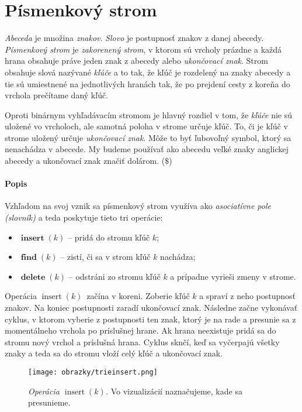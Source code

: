 
\def\k{k}
\def\put{$\mathop{insert}(\k)$}
\def\find{$\mathop{find}(\k)$}
\def\delete{$\mathop{delete}(\k)$}
\def\trie{trie}

\section{Písmenkový strom}
\emph{Abeceda} je množina \emph{znakov}. \emph{Slovo} je postupnosť znakov 
z danej abecedy. \emph{Písmenkový strom} je \emph{zakorenený strom}, v ktorom 
sú vrcholy prázdne a každá hrana obsahuje práve jeden znak z abecedy alebo 
\emph{ukončovací znak}. Strom 
obsahuje slová nazývané \emph{kľúče} a to tak, že kľúč je rozdelený na znaky 
abecedy a tie sú umiestnené na jednotlivých hranách tak, že po prejdení cesty 
z koreňa do vrchola prečítame daný kľúč. 

Oproti binárnym vyhľadávacím stromom je hlavný rozdiel v tom, že \emph{kľúče} 
nie sú uložené vo vrcholoch, ale samotná poloha v strome určuje kľúč. To, či 
je kľúč v strome uložený určuje \emph{ukončovací znak}. Môže to byť ľubovoľný 
symbol, ktorý sa nenachádza v abecede. My budeme používať ako abecedu veľké 
znaky anglickej abecedy a ukončovací znak značiť dolárom. ($\$$)

\paragraph{Popis}
Vzhľadom na svoj vznik sa písmenkový strom využíva ako \emph{asociatívne pole 
(slovník)} a teda poskytuje tieto tri operácie:
\begin{itemize}
\item $\mathop{\mathbf{insert}}(\k)$ -- pridá do stromu kľúč $\k$;
\item $\mathop{\mathbf{find}}(\k)$ -- zistí, či sa v strom kľúč $\k$ nachádza;
\item $\mathop{\mathbf{delete}}(\k)$ -- odstráni zo stromu kľúč $\k$ a 
prípadne vyrieši zmeny v strome.
\end{itemize}
Operácia \put\ začína v koreni. Zoberie kľúč $k$ a spraví z neho postupnosť 
znakov. Na koniec postupnosti zaradí ukončovací znak. 
Následne začne vykonávať cyklus, v ktorom vyberie z postupnosti ten znak, 
ktorý je na rade a presunie sa z momentálneho vrchola po príslušnej hrane. 
Ak hrana neexistuje pridá sa do stromu nový vrchol a príslušná hrana. Cyklus 
sknčí, keď sa vyčerpajú všetky znaky a teda sa do stromu vloží celý kľúč a 
ukončovací znak.

\begin{figure*}
\texttt{[image: obrazky/trieinsert.png]}
\caption{\emph{Operácia \put.} Vo vizualizácií naznačujeme, kade sa 
presunieme.} 
\label{img:trieinsert} 
\end{figure*}


